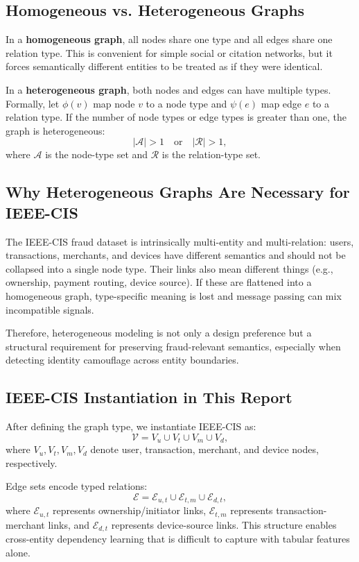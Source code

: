 \documentclass[12pt,a4paper]{report}
\begin{document}
\subsection{Homogeneous vs. Heterogeneous Graphs}
In a \textbf{homogeneous graph}, all nodes share one type and all edges share one relation type. This is convenient for simple social or citation networks, but it forces semantically different entities to be treated as if they were identical.

In a \textbf{heterogeneous graph}, both nodes and edges can have multiple types. Formally, let $\phi(v)$ map node $v$ to a node type and $\psi(e)$ map edge $e$ to a relation type. If the number of node types or edge types is greater than one, the graph is heterogeneous:
\[
|\mathcal{A}|>1 \quad \text{or} \quad |\mathcal{R}|>1,
\]
where $\mathcal{A}$ is the node-type set and $\mathcal{R}$ is the relation-type set.

\subsection{Why Heterogeneous Graphs Are Necessary for IEEE-CIS}
The IEEE-CIS fraud dataset is intrinsically multi-entity and multi-relation: users, transactions, merchants, and devices have different semantics and should not be collapsed into a single node type. Their links also mean different things (e.g., ownership, payment routing, device source). If these are flattened into a homogeneous graph, type-specific meaning is lost and message passing can mix incompatible signals.

Therefore, heterogeneous modeling is not only a design preference but a structural requirement for preserving fraud-relevant semantics, especially when detecting identity camouflage across entity boundaries.

\subsection{IEEE-CIS Instantiation in This Report}
After defining the graph type, we instantiate IEEE-CIS as:
\begin{equation}
\mathcal{V}=V_u \cup V_t \cup V_m \cup V_d,
\label{eq:hgraph-nodes}
\end{equation}
where $V_u, V_t, V_m, V_d$ denote user, transaction, merchant, and device nodes, respectively.

Edge sets encode typed relations:
\begin{equation}
\mathcal{E}=\mathcal{E}_{u,t}\cup\mathcal{E}_{t,m}\cup\mathcal{E}_{d,t},
\label{eq:hgraph-edges}
\end{equation}
where $\mathcal{E}_{u,t}$ represents ownership/initiator links, $\mathcal{E}_{t,m}$ represents transaction-merchant links, and $\mathcal{E}_{d,t}$ represents device-source links. This structure enables cross-entity dependency learning that is difficult to capture with tabular features alone.
\end{document}
